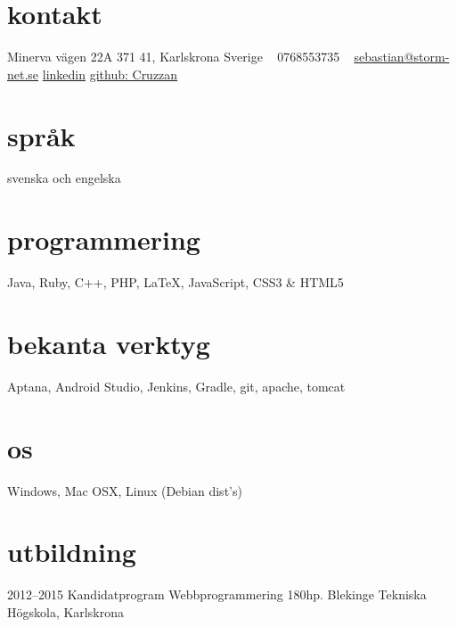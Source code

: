 \documentclass[]{friggeri-cv} %
\begin{document}


\begin{aside} %
\section{kontakt}
Minerva vägen 22A
371 41, Karlskrona
Sverige
~
0768553735
~
\href{mailto:sebastian@storm-net.se}{sebastian@storm-net.se}
\href{https://se.linkedin.com/pub/sebastian-hultstrand/60/51a/151}{linkedin}
\href{https://github.com/cruzzan}{github: Cruzzan}
\section{språk}
svenska och engelska
\section{programmering}
Java, Ruby, C++, PHP, LaTeX, JavaScript, CSS3 \& HTML5
\section{bekanta verktyg}
Aptana, Android Studio, Jenkins, Gradle, git, apache, tomcat
\section{os}
Windows, Mac OSX, Linux (Debian dist's)
\end{aside}


\section{utbildning}

\begin{entrylist}
\entry
{2012--2015}
{Kandidatprogram Webbprogrammering 180hp.}
{Blekinge Tekniska Högskola, Karlskrona}
{}
\end{entrylist}
\end{document}
